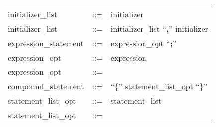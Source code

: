 \begin{longtable}{lrl}
\begin{minipage}[t]{\rulerhs}
  \end{minipage}                                                             \\
initializer\_list                          & ::= &
  \begin{minipage}[t]{\rulerhs}
    \raggedright
    initializer
  \end{minipage}                                                             \\
initializer\_list                          & ::= &
  \begin{minipage}[t]{\rulerhs}
    \raggedright
    initializer\_list ``{\bf ,}'' initializer
  \end{minipage}                                                             \\
expression\_statement                      & ::= &
  \begin{minipage}[t]{\rulerhs}
    \raggedright
    expression\_opt ``{\bf ;}''
  \end{minipage}                                                             \\
expression\_opt                            & ::= &
  \begin{minipage}[t]{\rulerhs}
    \raggedright
    expression
  \end{minipage}                                                             \\
expression\_opt                            & ::= &
  \begin{minipage}[t]{\rulerhs}
    \raggedright
    
  \end{minipage}                                                             \\
compound\_statement                        & ::= &
  \begin{minipage}[t]{\rulerhs}
    \raggedright
    ``{\bf $\{$}'' statement\_list\_opt ``{\bf $\}$}''
  \end{minipage}                                                             \\
statement\_list\_opt                       & ::= &
  \begin{minipage}[t]{\rulerhs}
    \raggedright
    statement\_list
  \end{minipage}                                                             \\
statement\_list\_opt                       & ::= &
  \begin{minipage}[t]{\rulerhs}
    \raggedright
    

\end{minipage}
\end{longtable}
